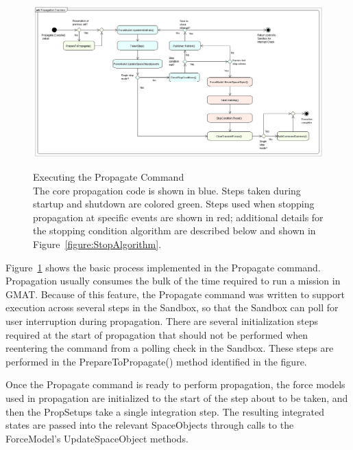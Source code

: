 \begin{figure}[htb]
\begin{center}
\includegraphics[445,233]{Images/PropagationOverview.png}
\begin{quote}
\caption[Executing the Propagate Command]{\label{figure:PropagateExecute}Executing the
Propagate Command\\The core propagation code is shown in blue.  Steps taken during startup and
shutdown are colored green.  Steps used when stopping propagation at specific events are shown in
red; additional details for the stopping condition algorithm are described below and shown in
Figure~\ref{figure:StopAlgorithm}.}
\end{quote}
\end{center}
\end{figure}

Figure~\ref{figure:PropagateExecute} shows the basic process implemented in the Propagate command.
Propagation usually consumes the bulk of the time required to run a mission in GMAT.  Because of
this feature, the Propagate command was written to support execution across several steps in the
Sandbox, so that the Sandbox can poll for user interruption during propagation.  There are several
initialization steps required at the start of propagation that should not be performed when
reentering the command from a polling check in the Sandbox.  These steps are performed in the
PrepareToPropagate() method identified in the figure.

Once the Propagate command is ready to perform propagation, the force models used in propagation are
initialized to the start of the step about to be taken, and then the PropSetups take a single
integration step.  The resulting integrated states are passed into the relevant SpaceObjects through
calls to the ForceModel's UpdateSpaceObject methods.

